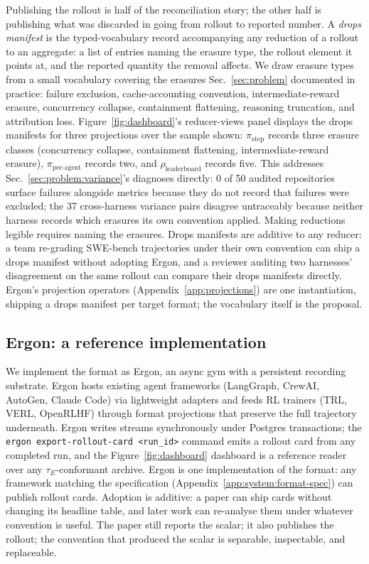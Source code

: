 \documentclass{article}
\begin{document}
Publishing the rollout is half of the reconciliation story;
the other half is publishing what was discarded in going from
rollout to reported number. A \emph{drops manifest} is the
typed-vocabulary record accompanying any reduction of a
rollout to an aggregate: a list of entries naming the erasure
type, the rollout element it points at, and the reported
quantity the removal affects. We draw erasure types from a
small vocabulary covering the erasures Sec.~\ref{sec:problem}
documented in practice: failure exclusion, cache-accounting
convention, intermediate-reward erasure, concurrency collapse,
containment flattening, reasoning truncation, and attribution
loss.
Figure~\ref{fig:dashboard}'s reducer-views panel displays the
drops manifests for three projections over the sample shown:
$\pi_{\text{step}}$ records three erasure classes (concurrency
collapse, containment flattening, intermediate-reward erasure),
$\pi_{\text{per-agent}}$ records two, and
$\rho_{\text{leaderboard}}$ records five.
This addresses
Sec.~\ref{sec:problem:variance}'s diagnoses directly: 0 of 50
audited repositories surface failures alongside metrics
because they do not record that failures were excluded; the 37
cross-harness variance pairs disagree untraceably because
neither harness records which erasures its own convention
applied. Making reductions legible requires naming the
erasures. Drops manifests are additive to any reducer: a team
re-grading SWE-bench trajectories under their own convention
can ship a drops manifest without adopting Ergon, and a
reviewer auditing two harnesses' disagreement on the same
rollout can compare their drops manifests directly. Ergon's
projection operators (Appendix~\ref{app:projections}) are one
instantiation, shipping a drops manifest per target format; the
vocabulary itself is the proposal.

\subsection{Ergon: a reference implementation}
\label{sec:system:ergon}

We implement the format as Ergon, an async gym with a
persistent recording substrate. Ergon hosts existing agent
frameworks (LangGraph, CrewAI, AutoGen, Claude Code) via
lightweight adapters and feeds RL trainers (TRL, VERL,
OpenRLHF) through format projections that preserve the full
trajectory underneath. Ergon writes streams synchronously
under Postgres transactions; the
\texttt{ergon export-rollout-card <run\_id>} command emits a
rollout card from any completed run, and the
Figure~\ref{fig:dashboard} dashboard is a reference reader
over any $\tau_E$-conformant archive. Ergon is one
implementation of the format: any framework matching the
specification (Appendix~\ref{app:system:format-spec}) can
publish rollout cards. Adoption is additive: a paper can ship
cards without changing its headline table, and later work can
re-analyse them under whatever convention is useful. The
paper still reports the scalar; it also publishes the rollout;
the convention that produced the scalar is separable,
inspectable, and replaceable.
\end{document}
